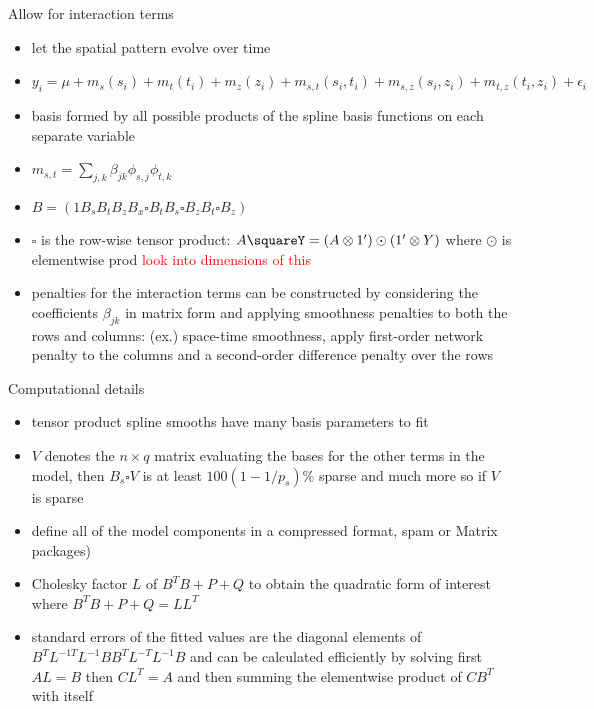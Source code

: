\documentclass[12pt]{amsart}
\begin{document}
Allow for interaction terms
\begin{itemize}
\item let the spatial pattern evolve over time
\item $y_i=\mu+m_s(s_i)+m_t(t_i)+m_z(z_i)+m_{s,t}(s_i,t_i)+m_{s,z}(s_i,z_i)+m_{t,z}(t_i,z_i)+\epsilon_i$
\item basis formed by all possible products of the spline basis functions on each separate variable
\item $m_{s,t}=\sum_{j,k} \beta_{jk}\phi_{s,j}\phi_{t,k}$
\item $B=(1 B_s B_t B_z B_x \square B_t B_s\square B_z B_t \square B_z)$
\item $\square$ is the row-wise tensor product: $A\squareY=(A\otimes 1') \odot (1' \otimes Y) $ where $\odot$ is elementwise prod \textcolor{red}{look into dimensions of this}
\item penalties for the interaction terms can be constructed by considering the coefficients $\beta_{jk}$ in matrix form and applying smoothness penalties to both the rows and columns: (ex.) space-time smoothness, apply first-order network penalty to the columns and a second-order difference penalty over the rows
\end{itemize}

Computational details
\begin{itemize}
\item tensor product spline smooths have many basis parameters to fit
\item $V$ denotes the $n \times q$ matrix evaluating the bases for the other terms in the model, then $B_s \square V$ is at least $100(1-1/p_s)\%$ sparse and much more so if $V$ is sparse
\item define all of the model components in a compressed format, spam or Matrix packages)
\item Cholesky factor $L$ of $B^TB+P+Q$ to obtain the quadratic form of interest where $B^TB+P+Q=LL^T$
\item standard errors of the fitted values are the diagonal elements of $B^TL^{-1T}L^{-1}BB^TL^{-T}L^{-1}B$ and can be calculated efficiently by solving first $AL=B$ then $CL^T=A$ and then summing the elementwise product of $CB^T$ with itself
\end{itemize}
\end{document}
